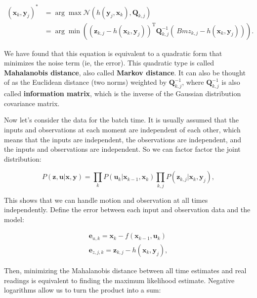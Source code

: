 \begin{equation}
\begin{aligned}
(\bm{x}_k,\bm{y}_j)^* &= \arg \max \mathcal{N}(h(\bm{y}_j, \bm{x}_k), \bm{Q }_{k,j}) \\ &= \arg \min \left( {{{\left( {{ \bm{z}_{k,j}} - h\left( {{\bm{x }_k},{\bm{y}_j}} \right)} \right)}^\mathrm{T}} \bm{Q}_{k,j}^{ - 1}\left( {{\ Bm{z}_{k,j}} - h\left( {{\bm{x}_k},{\bm{y}_j}} \right)} \right)} \right).
\end{aligned}
\end{equation}

We have found that this equation is equivalent to a quadratic form that minimizes the noise term (ie, the error). This quadratic type is called \textbf{Mahalanobis distance}, also called \textbf{Markov distance}. It can also be thought of as the Euclidean distance (two norms) weighted by $\bm{Q}_{k,j}^{-1}$, where $\bm{Q}_{k,j} ^{-1}$ is also called \textbf{information matrix}, which is the inverse of the Gaussian distribution covariance matrix.
	
Now let's consider the data for the batch time. It is usually assumed that the inputs and observations at each moment are independent of each other, which means that the inputs are independent, the observations are independent, and the inputs and observations are independent. So we can factor factor the joint distribution:

\begin{equation}
P\left( {\bm{z},\bm{u}|\bm{x},\bm{y}} \right) = \prod\limits_k {P\left( {{\bm{u}_k}|{\bm{x}_{k - 1}},{\bm{x}_k}} \right)} \prod\limits_{k,j} {P\left( {{\bm{z}_{k,j}}|{\bm{x}_k},{\bm{y}_j}} \right)},	
\end{equation}

This shows that we can handle motion and observation at all times independently. Define the error between each input and observation data and the model:

\begin{equation}
\begin{array}{l}
{\bm{e}_{u,k}} = {\bm{x}_k} - f\left( {{\bm{x}_{k - 1}},{\bm{u}_k}} \right)\\
{\bm{e}_{z,j,k}} = {\bm{z}_{k,j}} - h\left( {{\bm{x}_k},{\bm{y}_j}} \right),
\end{array}
\end{equation}

Then, minimizing the Mahalanobis distance between all time estimates and real readings is equivalent to finding the maximum likelihood estimate. Negative logarithms allow us to turn the product into a sum:


